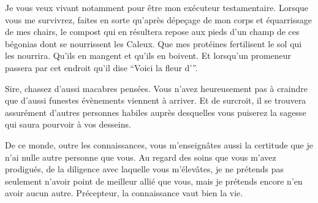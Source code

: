 \begin{drama}
               Je vous veux vivant notamment pour être mon exécuteur testamentaire. Lorsque vous me survivrez, faites en sorte qu’après dépeçage de mon corps et équarrissage de mes chairs, le compost qui en résultera repose aux pieds d’un champ de ces bégonias dont se nourrissent les Caleux. Que mes protéines fertilisent le sol qui les nourrira. Qu’ils en mangent et qu’ils en boivent. Et lorsqu’un promeneur passera par cet endroit qu’il dise \enquote{Voici la fleur d’\elena}.

  \alexasspeaks Sire, chassez d’aussi macabres pensées. Vous n’avez heureusement pas à craindre que d’aussi funestes évènements viennent à arriver. Et de surcroit, il se trouvera assurément d’autres personnes habiles auprès desquelles vous puiserez la sagesse qui saura pourvoir à vos desseins.

  \elenaspeaks De ce monde, outre les connaissances, vous m’enseignâtes aussi la certitude que je n’ai nulle autre personne que vous. Au regard des soins que vous m’avez prodigués, de la diligence avec laquelle vous m’élevâtes, je ne prétends pas seulement n’avoir point de meilleur allié que vous, mais je prétends encore n’en avoir aucun autre. Précepteur, la connaissance vaut bien la vie.
\end{drama}

\act

\scene


\StageDirII{\choir, \elena, \ela, \maquerelle}



